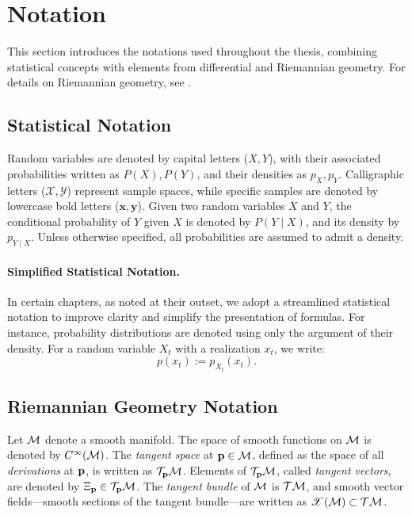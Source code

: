 
\section*{Notation}
\label{sec:notation}

This section introduces the notations used throughout the thesis, combining statistical concepts with elements from differential and Riemannian geometry. For details on Riemannian geometry, see \cite{boothby2003introduction,carmo1992riemannian,lee2013smooth,sakai1996riemannian}.

\subsection*{Statistical Notation}
Random variables are denoted by capital letters (\(X, Y\)), with their associated probabilities written as \(P(X), P(Y)\), and their densities as \(p_X, p_Y\). Calligraphic letters (\(\mathcal{X}, \mathcal{Y}\)) represent sample spaces, while specific samples are denoted by lowercase bold letters (\(\mathbf{x}, \mathbf{y}\)). Given two random variables \(X\) and \(Y\), the conditional probability of \(Y\) given \(X\) is denoted by \(P(Y \mid X)\), and its density by \(p_{Y \mid X}\). Unless otherwise specified, all probabilities are assumed to admit a density.

\paragraph{Simplified Statistical Notation.}  
In certain chapters, as noted at their outset, we adopt a streamlined statistical notation to improve clarity and simplify the presentation of formulas. For instance, probability distributions are denoted using only the argument of their density. For a random variable \(X_t\) with a realization \(x_t\), we write:  
\[
p(x_t) := p_{X_t}(x_t).
\]

\subsection*{Riemannian Geometry Notation}
Let \(\mathcal{M}\) denote a smooth manifold. The space of smooth functions on \(\mathcal{M}\) is denoted by \(C^\infty(\mathcal{M})\). The \emph{tangent space} at \(\mathbf{p} \in \mathcal{M}\), defined as the space of all \emph{derivations} at \(\mathbf{p}\), is written as \(\mathcal{T}_{\mathbf{p}} \mathcal{M}\). Elements of \(\mathcal{T}_{\mathbf{p}} \mathcal{M}\), called \emph{tangent vectors}, are denoted by \(\Xi_{\mathbf{p}} \in \mathcal{T}_{\mathbf{p}} \mathcal{M}\). The \emph{tangent bundle} of \(\mathcal{M}\) is \(\mathcal{T} \mathcal{M}\), and smooth vector fields—smooth sections of the tangent bundle—are written as \(\mathscr{X}(\mathcal{M}) \subset \mathcal{T} \mathcal{M}\).


